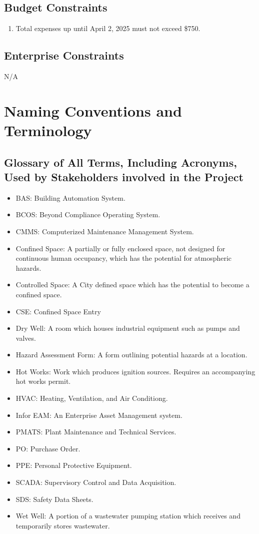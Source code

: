 \documentclass[12pt]{article}
\begin{document}
\subsection{Budget Constraints}
\begin{enumerate} [{C-BDG}1.]
  \item Total expenses up until April 2, 2025 must not exceed \$750.
\end{enumerate}

\subsection{Enterprise Constraints}
N/A

\section{Naming Conventions and Terminology}
\subsection{Glossary of All Terms, Including Acronyms, Used by Stakeholders
involved in the Project}
\begin{itemize}
    \item BAS: Building Automation System.
    \item BCOS: Beyond Compliance Operating System.
    \item CMMS: Computerized Maintenance Management System.
    \item Confined Space: A partially or fully enclosed space, not designed for 
    continuous human occupancy, which has the potential for 
    atmospheric hazards.
    \item Controlled Space: A City defined space which has the potential to
    become a confined space.
    \item CSE: Confined Space Entry
    \item Dry Well: A room which houses industrial equipment such as pumps 
    and valves.
    \item Hazard Assessment Form: A form outlining potential
    hazards at a location.
    \item Hot Works: Work which produces ignition sources.
    Requires an accompanying hot works permit.
    \item HVAC: Heating, Ventilation, and Air Conditiong.
    \item Infor EAM: An Enterprise Asset Management system.
    \item PMATS: Plant Maintenance and Technical Services.
    \item PO: Purchase Order.
    \item PPE: Personal Protective Equipment.
    \item SCADA: Supervisory Control and Data Acquisition.
    \item SDS: Safety Data Sheets.
    \item Wet Well: A portion of a wastewater pumping station which receives
    and temporarily stores wastewater.
\end{itemize}
\end{document}
